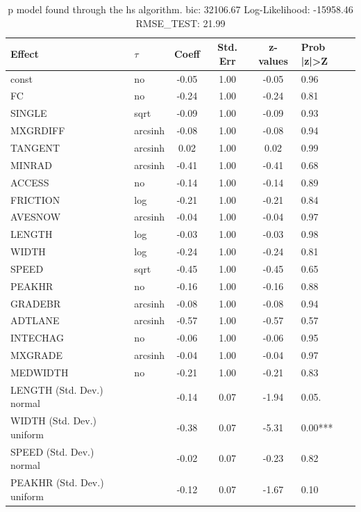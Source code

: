 \begin{table}
	\caption{p model found through the hs algorithm. bic: 32106.67 Log-Likelihood: -15958.46 RMSE_TEST: 21.99}
	\begin{center}
		\begin{tabular}{|l|l|c|c|c|l|}
			\hline
			Effect & $\tau$ & Coeff & Std. Err & z-values & Prob |z|>Z \\
			\hline
			const & no & -0.05 & 1.00 & -0.05 & 0.96 \\
			\hline
			FC & no & -0.24 & 1.00 & -0.24 & 0.81 \\
			\hline
			SINGLE & sqrt & -0.09 & 1.00 & -0.09 & 0.93 \\
			\hline
			MXGRDIFF & arcsinh & -0.08 & 1.00 & -0.08 & 0.94 \\
			\hline
			TANGENT & arcsinh & 0.02 & 1.00 & 0.02 & 0.99 \\
			\hline
			MINRAD & arcsinh & -0.41 & 1.00 & -0.41 & 0.68 \\
			\hline
			ACCESS & no & -0.14 & 1.00 & -0.14 & 0.89 \\
			\hline
			FRICTION & log & -0.21 & 1.00 & -0.21 & 0.84 \\
			\hline
			AVESNOW & arcsinh & -0.04 & 1.00 & -0.04 & 0.97 \\
			\hline
			LENGTH & log & -0.03 & 1.00 & -0.03 & 0.98 \\
			\hline
			WIDTH & log & -0.24 & 1.00 & -0.24 & 0.81 \\
			\hline
			SPEED & sqrt & -0.45 & 1.00 & -0.45 & 0.65 \\
			\hline
			PEAKHR & no & -0.16 & 1.00 & -0.16 & 0.88 \\
			\hline
			GRADEBR & arcsinh & -0.08 & 1.00 & -0.08 & 0.94 \\
			\hline
			ADTLANE & arcsinh & -0.57 & 1.00 & -0.57 & 0.57 \\
			\hline
			INTECHAG & no & -0.06 & 1.00 & -0.06 & 0.95 \\
			\hline
			MXGRADE & arcsinh & -0.04 & 1.00 & -0.04 & 0.97 \\
			\hline
			MEDWIDTH & no & -0.21 & 1.00 & -0.21 & 0.83 \\
			\hline
			LENGTH (Std. Dev.) normal &  & -0.14 & 0.07 & -1.94 & 0.05. \\
			\hline
			WIDTH (Std. Dev.) uniform &  & -0.38 & 0.07 & -5.31 & 0.00*** \\
			\hline
			SPEED (Std. Dev.) normal &  & -0.02 & 0.07 & -0.23 & 0.82 \\
			\hline
			PEAKHR (Std. Dev.) uniform &  & -0.12 & 0.07 & -1.67 & 0.10 \\

\end{tabular}
\end{center}
\end{table}

